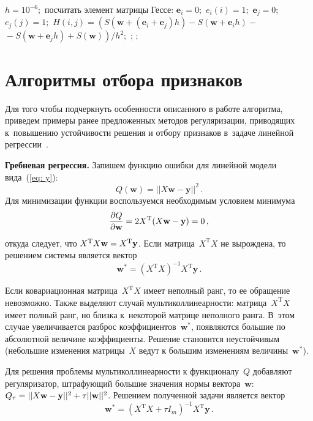 \begin{multicols}{2}
\begin{algorithmic}
    \STATE$h=10^{-6};$ 
        \STATE посчитать элемент матрицы Гессе:
        \STATE $\mathbf{e}_i=0;$ 
        \STATE $e_i(i)=1;$
        \STATE $\mathbf{e}_j=0;$
        \STATE $e_j(j)=1;$
        \STATE $H(i,j) =
        \left(S(\mathbf{w}+(\mathbf{e}_i+\mathbf{e}_j)h)-S(\mathbf{w}+\mathbf{e}_{i}h)-{}\right.$
        \STATE $\left.{}-S(\mathbf{w}+\mathbf{e}_{j}h)+S(\mathbf{w})\right)/h^2;$
        \ENDFOR
        \EXIT ;
    \ENDFOR
    \EXIT ;
\end{algorithmic}

\section{Алгоритмы отбора признаков}

Для того чтобы подчеркнуть особенности описанного в работе
алгоритма, приведем примеры ранее предложенных методов
регуляризации, приводящих к~повышению устойчивости решения и  отбору
признаков в~задаче линейной регрессии~\cite{lasso, ridzh2}.

\smallskip

\textbf{Гребневая регрессия.}
Запишем функцию ошибки для линейной модели вида~(\ref{eq: y}):
$$
Q(\mathbf{w})=||X\mathbf{w}-\mathbf{y}||^2\,.
$$
Для минимизации функции воспользуемся необходимым условием минимума
$$
\displaystyle\frac{\displaystyle \partial Q\mathstrut}{\displaystyle \partial \mathbf{w}\mathstrut}=2X^{\mathrm{T}}(X\mathbf{w}-\mathbf{y})=0\,,
$$
откуда следует, что $X^{\mathrm{T}}X\mathbf{w}\hm=X^{\mathrm{T}}\mathbf{y}$. 
Если матрица~$X^{\mathrm{T}}X$ не вырождена, то решением системы является вектор
$$
\mathbf{w}^{*}=\left(X^{\mathrm{T}}X\right)^{-1}X^{\mathrm{T}}\mathbf{y}\,.
$$

Если ковариационная матрица~$X^{\mathrm{T}}X$ имеет неполный ранг, то ее
обращение невозможно.  Также выделяют случай мультиколлинеарности:
матрица~$X^{\mathrm{T}}X$ имеет полный ранг, но близка к~некоторой матрице
неполного ранга. В~этом случае увеличивается разброс
коэффициентов~$\mathbf{w}^{*}$, появляются большие по абсолютной
величине коэффициенты. Решение становится неустойчивым (небольшие
изменения матрицы~$X$ ведут к большим изменениям
величины~$\mathbf{w}^{*}$).

Для решения проблемы мультиколлинеарности к функционалу~$Q$
добавляют регуляризатор, штрафующий большие значения нормы
вектора~$\mathbf{w}$:
$Q_\tau\hm=||X\mathbf{w}\hm-\mathbf{y}||^2\hm+\tau||\mathbf{w}||^2$. Решением
полученной задачи является вектор
$$
\mathbf{w}^{*}=\left(X^{\mathrm{T}}X+\tau I_m\right)^{-1}X^{\mathrm{T}}\mathbf{y}\,.
$$


\end{multicols}
